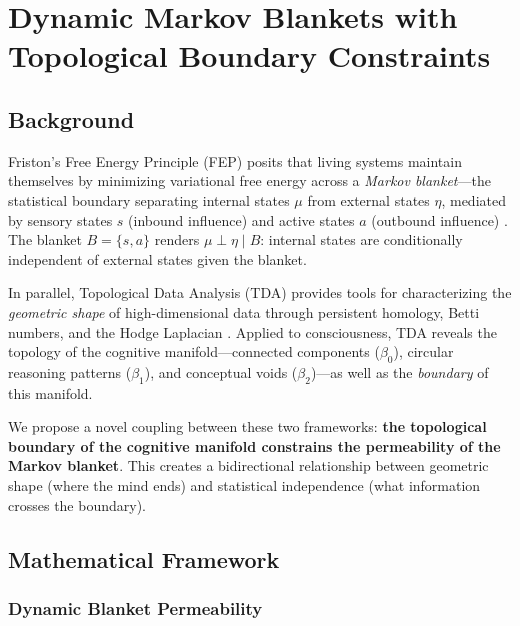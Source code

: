
\section{Dynamic Markov Blankets with Topological Boundary Constraints}
\label{sec:markov-blanket-topology}

\subsection{Background}

Friston's Free Energy Principle (FEP) posits that living systems maintain themselves
by minimizing variational free energy across a \emph{Markov blanket}---the statistical
boundary separating internal states $\mu$ from external states $\eta$, mediated by
sensory states $s$ (inbound influence) and active states $a$ (outbound influence)
\citep{friston2013life, kirchhoff2018markov}. The blanket $B = \{s, a\}$ renders
$\mu \perp \eta \mid B$: internal states are conditionally independent of external
states given the blanket.

In parallel, Topological Data Analysis (TDA) provides tools for characterizing the
\emph{geometric shape} of high-dimensional data through persistent homology, Betti
numbers, and the Hodge Laplacian \citep{carlsson2009topology, lim2020hodge}. Applied
to consciousness, TDA reveals the topology of the cognitive manifold---connected
components ($\beta_0$), circular reasoning patterns ($\beta_1$), and conceptual
voids ($\beta_2$)---as well as the \emph{boundary} of this manifold.

We propose a novel coupling between these two frameworks: \textbf{the topological
boundary of the cognitive manifold constrains the permeability of the Markov blanket}.
This creates a bidirectional relationship between geometric shape (where the mind
ends) and statistical independence (what information crosses the boundary).

\subsection{Mathematical Framework}

\subsubsection{Dynamic Blanket Permeability}

